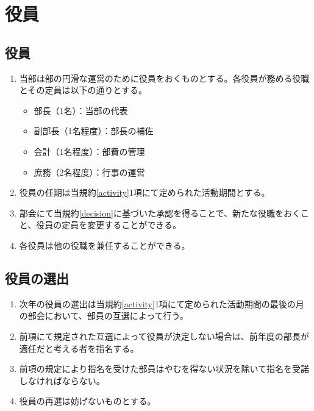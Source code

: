 \documentclass[12pt, unicode, a4paper]{ltjsreport}
\begin{document}
\chapter{役員}
    \section{役員}\label{directors}
        \begin{enumerate}
            \item 当部は部の円滑な運営のために役員をおくものとする。各役員が務める役職とその定員は以下の通りとする。
            \begin{itemize}
                \item 部長（1名）：当部の代表
                \item 副部長（1名程度）：部長の補佐
                \item 会計（1名程度）：部費の管理
                \item 庶務（2名程度）：行事の運営
            \end{itemize}
            \item 役員の任期は当規約\ref{activity}1項にて定められた活動期間とする。
            \item 部会にて当規約\ref{decision}に基づいた承認を得ることで、新たな役職をおくこと、役員の定員を変更することができる。
            \item 各役員は他の役職を兼任することができる。
        \end{enumerate}

    \section{役員の選出}\label{election}
        \begin{enumerate}
            \item 次年の役員の選出は当規約\ref{activity}1項にて定められた活動期間の最後の月の部会において、部員の互選によって行う。
            \item 前項にて規定された互選によって役員が決定しない場合は、前年度の部長が適任だと考える者を指名する。
            \item 前項の規定により指名を受けた部員はやむを得ない状況を除いて指名を受諾しなければならない。
            \item 役員の再選は妨げないものとする。
        \end{enumerate}
\end{document}
